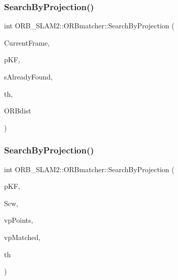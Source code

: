 \subsubsection{\texorpdfstring{Search\+By\+Projection()}{SearchByProjection()}\hspace{0.1cm}{\footnotesize\ttfamily [3/4]}}
{\footnotesize\ttfamily int O\+R\+B\+\_\+\+S\+L\+A\+M2\+::\+O\+R\+Bmatcher\+::\+Search\+By\+Projection (\begin{DoxyParamCaption}\item[{\mbox{\hyperlink{class_o_r_b___s_l_a_m2_1_1_frame}{Frame}} \&}]{Current\+Frame,  }\item[{\mbox{\hyperlink{class_o_r_b___s_l_a_m2_1_1_key_frame}{Key\+Frame}} $\ast$}]{p\+KF,  }\item[{const std\+::set$<$ \mbox{\hyperlink{class_o_r_b___s_l_a_m2_1_1_map_point}{Map\+Point}} $\ast$$>$ \&}]{s\+Already\+Found,  }\item[{const float}]{th,  }\item[{const int}]{O\+R\+Bdist }\end{DoxyParamCaption})}

\mbox{\label{class_o_r_b___s_l_a_m2_1_1_o_r_bmatcher_ac1c0dcdeed922c9a96760aa9a76a2fdb}} 
\subsubsection{\texorpdfstring{Search\+By\+Projection()}{SearchByProjection()}\hspace{0.1cm}{\footnotesize\ttfamily [4/4]}}
{\footnotesize\ttfamily int O\+R\+B\+\_\+\+S\+L\+A\+M2\+::\+O\+R\+Bmatcher\+::\+Search\+By\+Projection (\begin{DoxyParamCaption}\item[{\mbox{\hyperlink{class_o_r_b___s_l_a_m2_1_1_key_frame}{Key\+Frame}} $\ast$}]{p\+KF,  }\item[{cv\+::\+Mat}]{Scw,  }\item[{const std\+::vector$<$ \mbox{\hyperlink{class_o_r_b___s_l_a_m2_1_1_map_point}{Map\+Point}} $\ast$$>$ \&}]{vp\+Points,  }\item[{std\+::vector$<$ \mbox{\hyperlink{class_o_r_b___s_l_a_m2_1_1_map_point}{Map\+Point}} $\ast$$>$ \&}]{vp\+Matched,  }\item[{int}]{th }\end{DoxyParamCaption})}


